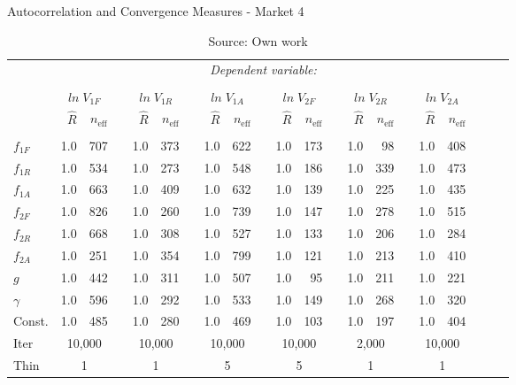 \begin{table}[H]
\caption{Autocorrelation and Convergence Measures - Market 4}
\label{mkt4_T_autocorr_convergence_SCOTYORK}
\centering
\begin{tabular}{lrrrrrrrrrrrrrrrrrrrr}
\toprule 
 & \multicolumn{17}{c}{\textit{Dependent variable:}} \\ 
\cline{2-21} 
\\[-1.8ex] & \multicolumn{2}{c}{$ln \; V_{1F}$} & & \multicolumn{2}{c}{$ln \; V_{1R}$} & & \multicolumn{2}{c}{$ln \; V_{1A}$} & & \multicolumn{2}{c}{$ln \; V_{2F}$} & & \multicolumn{2}{c}{ $ln \; V_{2R}$} & &  \multicolumn{2}{c}{ $ln \; V_{2A}$}\\ 
\cline{2-3} \cline{5-6} \cline{8-9} \cline{11-12} \cline{14-15} \cline{17-18}
 & $\hat{R}$ & $n_{\text{eff}}$ & & $\hat{R}$ & $n_{\text{eff}}$  & & $\hat{R}$ & $n_{\text{eff}}$ & & $\hat{R}$ & $n_{\text{eff}}$ & & $\hat{R}$ & $n_{\text{eff}}$ & & $\hat{R}$ & $n_{\text{eff}}$\\  
\hline \\[-1.8ex] 
  $f_{1F}$ & 1.0 & 707 & & 1.0 & 373 & & 1.0 & 622 & & 1.0 & 173 & & 1.0 & 98 & & 1.0 & 408 \\
  $f_{1R}$ & 1.0 & 534 & & 1.0 & 273 & & 1.0 & 548 & & 1.0 & 186 & & 1.0 & 339 & & 1.0 & 473 \\
  $f_{1A}$ & 1.0 & 663 & & 1.0 & 409 & & 1.0 & 632 & & 1.0 & 139 & & 1.0 & 225 & & 1.0 & 435 \\
  $f_{2F}$ & 1.0 & 826 & & 1.0 & 260 & & 1.0 & 739 & & 1.0 & 147 & & 1.0 & 278 & & 1.0 & 515 \\
  $f_{2R}$ & 1.0 & 668 & & 1.0 & 308 & & 1.0 & 527 & & 1.0 & 133 & & 1.0 & 206 & & 1.0 & 284 \\
  $f_{2A}$ & 1.0 & 251 & & 1.0 & 354 & & 1.0 & 799 & & 1.0 & 121 & & 1.0 & 213 & & 1.0 & 410 \\
  $g$      & 1.0 & 442 & & 1.0 & 311 & & 1.0 & 507 & & 1.0 & 95  & & 1.0 & 211 & & 1.0 & 221 \\
  $\gamma$ & 1.0 & 596 & & 1.0 & 292 & & 1.0 & 533 & & 1.0 & 149 & & 1.0 & 268 & & 1.0 & 320 \\
  Const. & 1.0 & 485 & & 1.0 & 280 & & 1.0 & 469 & & 1.0 & 103  & & 1.0 & 197 & & 1.0 & 404 \\
  \hline
  Iter     & \multicolumn{2}{c}{10,000} && \multicolumn{2}{c}{10,000} && \multicolumn{2}{c}{10,000} && \multicolumn{2}{c}{10,000} && \multicolumn{2}{c}{2,000} && \multicolumn{2}{c}{10,000}\\
  Thin     & \multicolumn{2}{c}{1} && \multicolumn{2}{c}{1} && \multicolumn{2}{c}{5} && \multicolumn{2}{c}{5} && \multicolumn{2}{c}{1} && \multicolumn{2}{c}{1}\\
   \bottomrule
\end{tabular}
\caption*{Source: Own work}
\end{table}